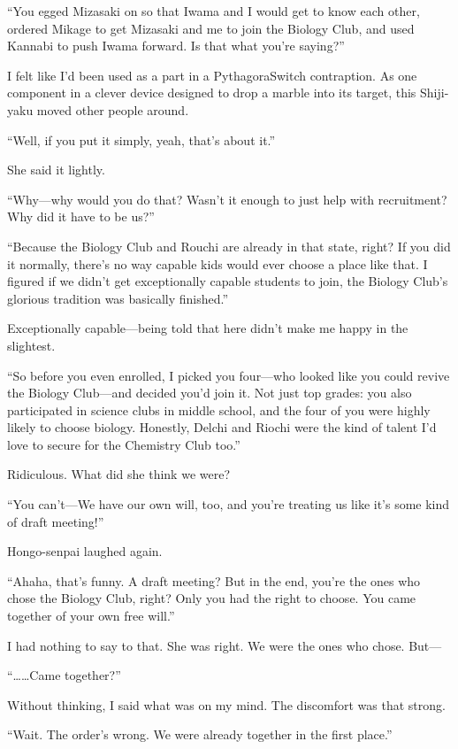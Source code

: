 \documentclass[
    a4paper,
    12pt,
    twoside,
    openany,
    UTF8,
    fontset=windows
]{ctexbook}
\begin{document}
``You egged Mizasaki on so that Iwama and I would get to know each other, ordered Mikage to get Mizasaki and me to join the Biology Club, and used Kannabi to push Iwama forward. Is that what you're saying?''

I felt like I'd been used as a part in a PythagoraSwitch contraption. As one component in a clever device designed to drop a marble into its target, this Shiji-yaku moved other people around.

``Well, if you put it simply, yeah, that's about it.''

She said it lightly.

``Why---why would you do that? Wasn't it enough to just help with recruitment? Why did it have to be us?''

``Because the Biology Club and Rouchi are already in that state, right? If you did it normally, there's no way capable kids would ever choose a place like that. I figured if we didn't get exceptionally capable students to join, the Biology Club's glorious tradition was basically finished.''

Exceptionally capable---being told that here didn't make me happy in the slightest.

``So before you even enrolled, I picked you four---who looked like you could revive the Biology Club---and decided you'd join it. Not just top grades: you also participated in science clubs in middle school, and the four of you were highly likely to choose biology. Honestly, Delchi and Riochi were the kind of talent I'd love to secure for the Chemistry Club too.''

Ridiculous. What did she think we were?

``You can't---We have our own will, too, and you're treating us like it's some kind of draft meeting!''

Hongo-senpai laughed again.

``Ahaha, that's funny. A draft meeting? But in the end, you're the ones who chose the Biology Club, right? Only you had the right to choose. You came together of your own free will.''

I had nothing to say to that. She was right. We were the ones who chose. But---

``\dots\dots Came together?''

Without thinking, I said what was on my mind. The discomfort was that strong.

``Wait. The order's wrong. We were already together in the first place.''
\end{document}
